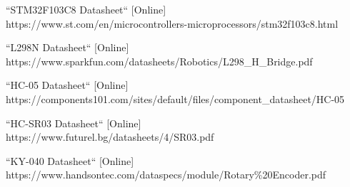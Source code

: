 \begin{thebibliography}{00}

     ``STM32F103C8 Datasheet`` [Online]\\
     https://www.st.com/en/microcontrollers-microprocessors/stm32f103c8.html

     ``L298N Datasheet`` [Online]\\
    https://www.sparkfun.com/datasheets/Robotics/L298\_H\_Bridge.pdf

     ``HC-05 Datasheet`` [Online]\\
    https://components101.com/sites/default/files/component\_datasheet/HC-05%

     ``HC-SR03 Datasheet`` [Online]\\
    https://www.futurel.bg/datasheets/4/SR03.pdf

     ``KY-040 Datasheet`` [Online]\\
    https://www.handsontec.com/dataspecs/module/Rotary\%20Encoder.pdf


\end{thebibliography}
  